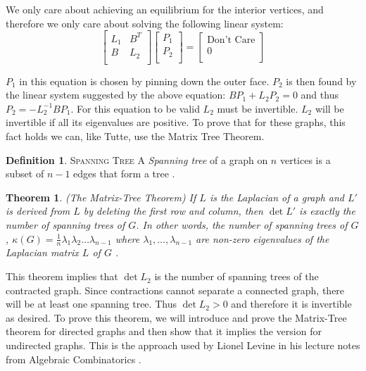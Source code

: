 \documentclass[11pt]{article}
\newtheorem{theorem}{Theorem}[section]
\theoremstyle{definition}
\newtheorem{definition}{Definition}[section]
\begin{document}
	We only care about achieving an equilibrium for the interior vertices, and therefore we only care about solving the following linear system:
		\begin{equation}
			\begin{bmatrix}
				L_1 & B^T \\
				B & L_2 \\
			\end{bmatrix}
			\begin{bmatrix}
			 	P_1 \\
    				P_2 \\
			\end{bmatrix}
			=
			\begin{bmatrix}
				\text{Don't Care} \\
				0 \\
			\end{bmatrix}
		\end{equation}
	
	$P_1$ in this equation is chosen by pinning down the outer face.
	$P_2$ is then found by the linear system suggested by the above equation: $BP_1 + L_2P_2 = 0$ and thus $P_2 = -L_2^{-1}BP_1$. 
	For this equation to be valid $L_2$ must be invertible. 
	$L_2$ will be invertible if all its eigenvalues are positive.
	To prove that for these graphs, this fact holds we can, like Tutte, use the Matrix Tree Theorem.
	
	\theoremstyle{definition}
	\begin{definition}{\textsc{Spanning Tree}}
		A \emph{Spanning tree} of a graph on $n$ vertices is a subset of $n-1$ edges that form a tree \cite{mathworld:SpanningTree}.
	\end{definition}
	
	\begin{theorem}{(The Matrix-Tree Theorem)}
		If $L$ is the Laplacian of a graph and $L'$ is derived from $L$ by deleting the first row and column, then $\det L'$ is exactly the number of spanning trees of $G$.
		In other words, the number of spanning trees of $G$, $\kappa(G) = \frac{1}{n} \lambda_1\lambda_2 \dots \lambda_{n-1}$ where $\lambda_1, \dots, \lambda_{n-1}$ are non-zero eigenvalues of the Laplacian matrix $L$ of $G$ \cite{matrixTree}.
	\end{theorem}
	
	This theorem implies that $\det L_2$ is the number of spanning trees of the contracted graph.
	Since contractions cannot separate a connected graph, there will be at least one spanning tree. 
	Thus $\det L_2 > 0$ and therefore it is invertible as desired.
	To prove this theorem, we will introduce and prove the Matrix-Tree theorem for directed graphs and then show that it implies the version for undirected graphs.
	This is the approach used by Lionel Levine in his lecture notes from Algebraic Combinatorics \cite{matrixTree}.
	
\end{document}

